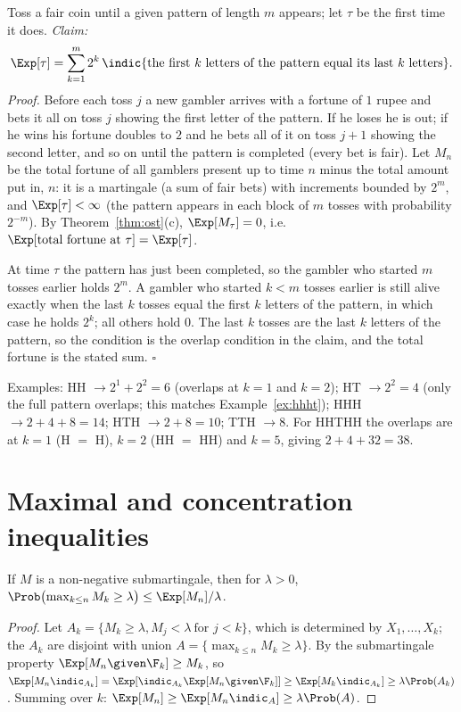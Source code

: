 \begin{example}\label{ex:pattern}
Toss a fair coin until a given pattern of length $m$ appears; let $\tau$ be the first time it
does. \emph{Claim:}
\[
\Exp[\tau]=\sum_{k=1}^m2^k\,\indic\{\text{the first }k\text{ letters of the pattern equal its last }k\text{ letters}\}.
\]
\emph{Proof.} Before each toss $j$ a new gambler arrives with a fortune of $1$ rupee and bets
it all on toss $j$ showing the first letter of the pattern. If he loses he is out; if he wins
his fortune doubles to $2$ and he bets all of it on toss $j+1$ showing the second letter, and
so on until the pattern is completed (every bet is fair). Let $M_n$ be the total fortune of
all gamblers present up to time $n$ minus the total amount put in, $n$: it is a martingale
(a sum of fair bets) with increments bounded by $2^m$, and $\Exp[\tau]<\infty$ (the pattern
appears in each block of $m$ tosses with probability $2^{-m}$). By
Theorem~\ref{thm:ost}(c), $\Exp[M_\tau]=0$, i.e.\ $\Exp[\text{total fortune at }\tau]=\Exp[\tau]$.

At time $\tau$ the pattern has just been completed, so the gambler who started $m$ tosses
earlier holds $2^m$. A gambler who started $k<m$ tosses earlier is still alive exactly when
the last $k$ tosses equal the first $k$ letters of the pattern, in which case he holds $2^k$;
all others hold $0$. The last $k$ tosses are the last $k$ letters of the pattern, so the
condition is the overlap condition in the claim, and the total fortune is the stated sum.
\hfill$\square$

Examples: HH $\to2^1+2^2=6$ (overlaps at $k=1$ and $k=2$); HT $\to2^2=4$ (only the
full pattern overlaps; this matches Example~\ref{ex:hhht}); HHH $\to2+4+8=14$;
HTH $\to2+8=10$; TTH $\to8$. For HHTHH the overlaps are at $k=1$ (H $=$ H), $k=2$
(HH $=$ HH) and $k=5$, giving $2+4+32=38$.
\end{example}

\section{Maximal and concentration inequalities}

\begin{theorem}\label{thm:doobmax}
If $M$ is a non-negative submartingale, then for $\lambda>0$,
$\Prob\bigl(\max_{k\le n}M_k\ge\lambda\bigr)\le\Exp[M_n]/\lambda$.
\end{theorem}
\begin{proof}
Let $A_k=\{M_k\ge\lambda,M_j<\lambda\ \text{for }j<k\}$, which is determined by $X_1,\dots,X_k$;
the $A_k$ are disjoint with union $A=\{\max_{k\le n}M_k\ge\lambda\}$. By the submartingale
property $\Exp[M_n\given\F_k]\ge M_k$, so
$\Exp[M_n\indic_{A_k}]=\Exp[\indic_{A_k}\Exp[M_n\given\F_k]]\ge\Exp[M_k\indic_{A_k}]\ge\lambda\Prob(A_k)$.
Summing over $k$: $\Exp[M_n]\ge\Exp[M_n\indic_A]\ge\lambda\Prob(A)$.
\end{proof}

